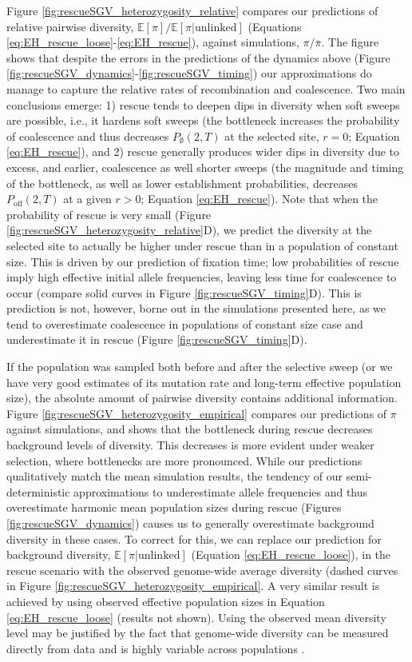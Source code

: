 \documentclass[]{article}
\begin{document}
Figure \ref{fig:rescueSGV_heterozygosity_relative} compares our predictions of relative pairwise diversity, $\mathbb{E}[\pi]/\mathbb{E}[\pi|\mathrm{unlinked}]$ (Equations \ref{eq:EH_rescue_loose}-\ref{eq:EH_rescue}), against simulations, $\pi/\overline{\pi}$.
The figure shows that despite the errors in the predictions of the dynamics above (Figure \ref{fig:rescueSGV_dynamics}-\ref{fig:rescueSGV_timing}) our approximations do manage to capture the relative rates of recombination and coalescence.
Two main conclusions emerge:
1) rescue tends to deepen dips in diversity when soft sweeps are possible, i.e., it hardens soft sweeps (the bottleneck increases the probability of coalescence and thus decreases $P_\emptyset(2,T)$ at the selected site, $r=0$; Equation \ref{eq:EH_rescue}), and
2) rescue generally produces wider dips in diversity due to excess, and earlier, coalescence as well shorter sweeps (the magnitude and timing of the bottleneck, as well as lower establishment probabilities, decreases $P_\mathrm{off}(2,T)$ at a given $r>0$; Equation \ref{eq:EH_rescue}).
Note that when the probability of rescue is very small (Figure \ref{fig:rescueSGV_heterozygosity_relative}D), we predict the diversity at the selected site to actually be higher under rescue than in a population of constant size.
This is driven by our prediction of fixation time; low probabilities of rescue imply high effective initial allele frequencies, leaving less time for coalescence to occur (compare solid curves in Figure \ref{fig:rescueSGV_timing}D).
This is prediction is not, however, borne out in the simulations presented here, as we tend to overestimate coalescence in populations of constant size case and underestimate it in rescue (Figure \ref{fig:rescueSGV_timing}D).

If the population was sampled both before and after the selective sweep (or we have very good estimates of its mutation rate and long-term effective population size), the absolute amount of pairwise diversity contains additional information.
Figure \ref{fig:rescueSGV_heterozygosity_empirical} compares our predictions of $\pi$ against simulations, and shows that the bottleneck during rescue decreases background levels of diversity. 
This decreases is more evident under weaker selection, where bottlenecks are more pronounced.
While our predictions qualitatively match the mean simulation results, the tendency of our semi-deterministic approximations to underestimate allele frequencies and thus overestimate harmonic mean population sizes during rescue (Figures \ref{fig:rescueSGV_dynamics}) causes us to generally overestimate background diversity in these cases.
To correct for this, we can replace our prediction for background diversity, $\mathbb{E}[\pi | \mathrm{unlinked}]$ (Equation \ref{eq:EH_rescue_loose}), in the rescue scenario with the observed genome-wide average diversity (dashed curves in Figure \ref{fig:rescueSGV_heterozygosity_empirical}.
A very similar result is achieved by using observed effective population sizes in Equation \ref{eq:EH_rescue_loose} (results not shown). 
Using the observed mean diversity level may be justified by the fact that genome-wide diversity can be measured directly from data and is highly variable across populations \citep{tajima1983evolutionary}.
\end{document}
